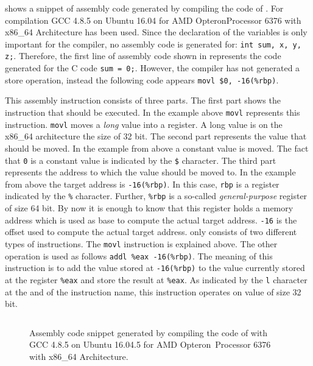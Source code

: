 \documentclass[onecolumn, openright, master, english, signatures]{dbrgrptt}
\begin{document}
 shows a snippet of assembly code generated by compiling the code of . For compilation GCC 4.8.5 on Ubuntu 16.04 for AMD Opteron\texttrademark Processor 6376 with x86\_64 Architecture has been used. Since the declaration of the variables is only important for the compiler, no assembly code is generated for: \texttt{int sum, x, y, z;}. Therefore, the first line of assembly code shown in  represents the code generated for the C code \texttt{sum = 0;}. However, the compiler has not generated a store operation, instead the following code appears \texttt{movl \$0, -16(\%rbp)}.

This assembly instruction consists of three parts. The first part shows the instruction that should be executed. In the example above \texttt{movl} represents this instruction. \texttt{movl} moves a \emph{long} value into a register. A long value is on the x86\_64 architecture the size of 32 bit. The second part represents the value that should be moved. In the example from above a constant value is moved. The fact that \texttt{0} is a constant value is indicated by the \texttt{\$} character. The third part represents the address to which the value should be moved to. In the example from above the target address is \texttt{-16(\%rbp)}. In this case, \texttt{rbp} is a register indicated by the \texttt{\%} character. Further, \texttt{\%rbp} is a so-called \emph{general-purpose} register of size 64 bit. By now it is enough to know that this register holds a memory address which is used as base to compute the actual target address. \texttt{-16} is the offset used to compute the actual target address.
 only consists of two different types of instructions. The \texttt{movl} instruction is explained above. The other operation is used as follows \texttt{addl \%eax -16(\%rbp)}. The meaning of this instruction is to add the value stored at \texttt{-16(\%rbp)} to the value currently stored at the register \texttt{\%eax} and store the result at \texttt{\%eax}. As indicated by the \texttt{l} character at the and of the instruction name, this instruction operates on value of size 32 bit.

\begin{figure}[!ht]
  \centering
  \begin{tabular}{c}
  
  \end{tabular}
  \caption{Assembly code snippet generated by compiling the code of  with GCC 4.8.5 on Ubuntu 16.04.5 for AMD Opteron\texttrademark~Processor 6376 with x86\_64 Architecture.}
  \label{fig:mat-example-assembly-code}
\end{figure}
\end{document}
